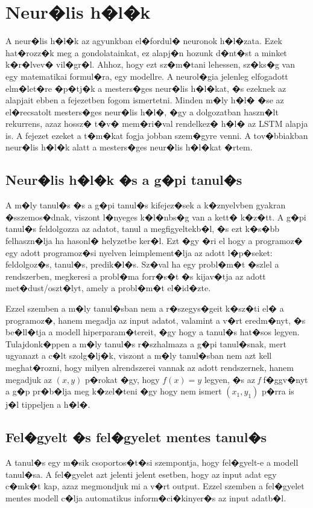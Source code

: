 \documentclass[12pt]{report}
\theoremstyle{definition}
\begin{document}
\chapter{Neur�lis h�l�k}

A neur�lis h�l�k az agyunkban el�fordul� neuronok h�l�zata. Ezek hat�rozz�k meg 
a gondolatainkat, ez alapj�n hozunk d�nt�st a minket k�r�lvev� vil�gr�l. Ahhoz, 
hogy ezt sz�m�tani lehessen, sz�ks�g van egy matematikai formul�ra, egy 
modellre. A neurol�gia jelenleg elfogadott elm�let�re �p�tj�k a mesters�ges 
neur�lis h�l�kat, �s ezeknek az alapjait ebben a fejezetben fogom ismertetni.
Minden m�ly h�l� �se az el�recsatolt mesters�ges neur�lis h�l�, �gy a dolgozatban haszn�lt rekurrens, azaz hossz� t�v� mem�ri�val rendelkez� h�l� az LSTM alapja is. A fejezet ezeket a t�m�kat fogja jobban szem�gyre venni. A tov�bbiakban neur�lis h�l�k alatt a mesters�ges neur�lis h�l�kat �rtem.

\section{Neur�lis h�l�k �s a g�pi tanul�s}
A m�ly tanul�s �s a g�pi tanul�s kifejez�sek a k�znyelvben gyakran �sszemos�dnak, viszont l�nyeges k�l�nbs�g van a kett� k�z�tt. A g�pi tanul�s feldolgozza az adatot, tanul a megfigyeltekb�l, �s ezt k�s�bb felhaszn�lja ha hasonl� helyzetbe ker�l. Ezt �gy �ri el hogy a programoz� egy adott programoz�si nyelven leimplement�lja az adott l�p�seket: feldolgoz�s, tanul�s, predik�l�s. Sz�val ha egy probl�m�t �szlel a rendszerben, megkeresi a probl�ma forr�s�t �s kijav�tja az adott met�dust/oszt�lyt, amely a probl�m�t el�id�zte.
 
Ezzel szemben a m�ly tanul�sban nem a r�szegys�geit k�sz�ti el� a programoz�, hanem megadja az input adatot, valamint a v�rt eredm�nyt, �s be�ll�tja a modell hiperparam�tereit, �gy hogy a tanul�s hat�sos legyen. Tulajdonk�ppen a m�ly tanul�s r�szhalmaza a g�pi tanul�snak, mert ugyanazt a c�lt szolg�lj�k, viszont a m�ly tanul�sban nem azt kell meghat�rozni, hogy milyen alrendszerei vannak az adott rendszernek, hanem megadjuk az $(x,y)$ p�rokat �gy, hogy $f(x)=y$ legyen, �s az \textit{f} f�ggv�nyt a g�p pr�b�lja meg k�zel�teni �gy hogy nem ismert $(x_1, y_1)$ p�rra is j�l tippeljen a h�l�.

\section{Fel�gyelt �s fel�gyelet mentes tanul�s}
A tanul�s egy m�sik csoportos�t�si szempontja, hogy fel�gyelt-e a modell tanul�sa. A fel�gyelet azt jelenti jelent esetben, hogy az input adat egy c�mk�t kap, azaz megmondjuk mi a v�rt output. Ezzel szemben a fel�gyelet mentes modell c�lja automatikus inform�ci�kinyer�s az input adatb�l. 
\end{document}
